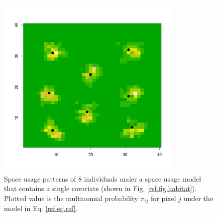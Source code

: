 \documentclass[12pt]{article}
\begin{document}
\begin{figure}
\centering
\includegraphics[width=3.5in,height=3.5in]{figs/homeranges8}
\caption{Space usage patterns of 8 individuals under a space usage
  model that contains a single covariate (shown in
  Fig. \ref{rsf.fig.habitat}). Plotted value is the multinomial
  probability $\pi_{ij}$ for pixel $j$ under the model in Eq. \ref{rsf.eq.rsf}.
}
\label{rsf.fig.homeranges}
\end{figure}



\clearpage
\newpage
\end{document}
